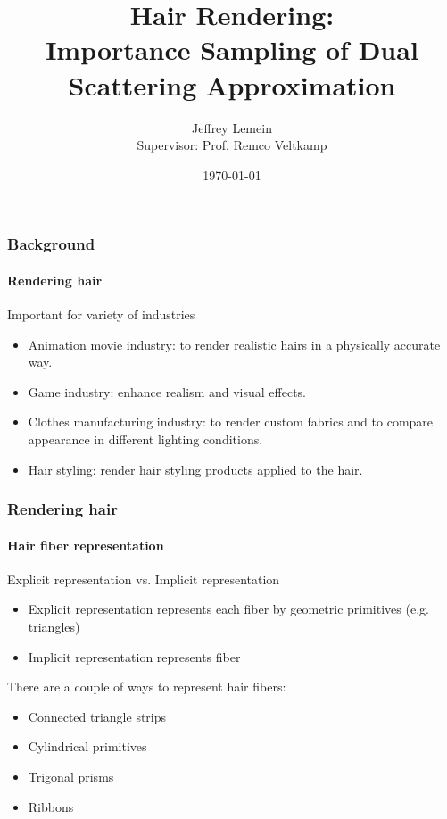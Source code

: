 \documentclass{beamer}
\begin{document}
\title[Hair Rendering]{Hair Rendering:\\ Importance
Sampling of Dual Scattering
Approximation}
\author[J. Lemein]{Jeffrey Lemein\\\small Supervisor: Prof. Remco Veltkamp \\ \hspace{18mm}}
\date{\today}

\begin{frame}
\titlepage
\end{frame}

  \begin{frame}
    \frametitle{Background}
	\framesubtitle{Rendering hair}
	
	Important for variety of industries
	\begin{itemize}
	\item Animation movie industry: to render realistic hairs in a physically accurate way.
	\item Game industry: enhance realism and visual effects.
	\item Clothes manufacturing industry: to render custom fabrics and to compare appearance in different lighting conditions.
	\item Hair styling: render hair styling products applied to the hair.
	\end{itemize}
  \end{frame}
  
  \begin{frame}
    \frametitle{Rendering hair}
	\framesubtitle{Hair fiber representation}
	Explicit representation vs. Implicit representation
	
	\begin{itemize}
	\item Explicit representation represents each fiber by geometric primitives (e.g. triangles)
	\item Implicit representation represents fiber
	\end{itemize}
	
	There are a couple of ways to represent hair fibers:
	\begin{itemize}
	\item Connected triangle strips
	\item Cylindrical primitives
	\item Trigonal prisms
	\item Ribbons
	\end{itemize}
	

  \end{frame}
  
\end{document}
